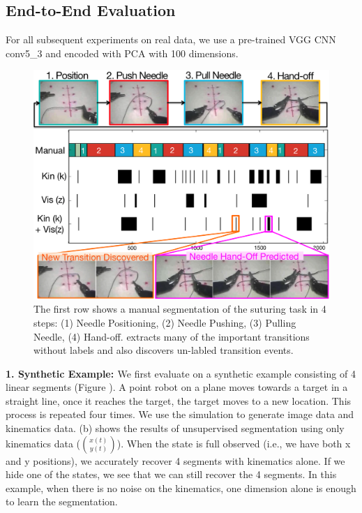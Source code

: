 \documentclass[0-main.tex]{subfiles}
\begin{document}
\subsection{End-to-End Evaluation}
For all subsequent experiments on real data, we use a pre-trained VGG CNN conv5\_3 and encoded with PCA with 100 dimensions. 

\begin{figure}[!t]
    \centering
    \includegraphics[width=\linewidth]{figures/suturing-v4}
	\caption{The first row shows a manual segmentation of the suturing task in 4 steps: (1) Needle Positioning, (2) Needle Pushing, (3) Pulling Needle, (4) Hand-off. \tsc extracts many of the important transitions without labels and also discovers un-labled transition events.
	\label{fig:suturing}}
\vspace{-15pt}
\end{figure}

\vspace{5pt}
\noindent \textbf{1. Synthetic Example: \label{sec:syn}}
We first evaluate \tsc on a synthetic example consisting of 4 linear segments (Figure ).
A point robot on a plane moves towards a target in a straight line, once it reaches the target, the target moves to a new location.
This process is repeated four times.
We use the simulation to generate image data and kinematics data.
 (b) shows the results of unsupervised segmentation  using only kinematics data ($\binom{x(t)}{y(t)}$). 
When the state is full observed (i.e., we have both x and y positions), we accurately recover 4 segments with kinematics alone.
If we hide one of the states, we see that we can still recover the 4 segments.
In this example, when there is no noise on the kinematics, one dimension alone is enough to learn the segmentation.
\end{document}

